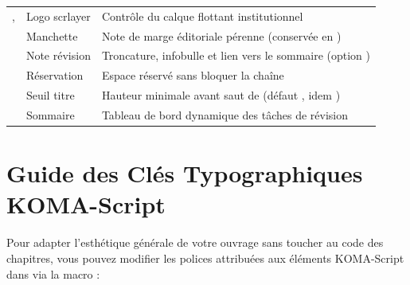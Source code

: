 \begin{table}[htbp]
\begin{tabularx}{\textwidth}{@{} l l Y @{}}
    ,  & Logo scrlayer & Contrôle du calque flottant institutionnel \\
     & Manchette & Note de marge éditoriale pérenne (conservée en ) \\
     & Note révision & Troncature, infobulle et lien vers le sommaire (option ) \\
     & Réservation & Espace réservé sans bloquer la chaîne \\
     & Seuil titre & Hauteur minimale avant saut de  (défaut , idem ) \\
     & Sommaire & Tableau de bord dynamique des tâches de révision \\
    \bottomrule
  \end{tabularx}
\end{table}

\clearpage

\section{Guide des Clés Typographiques KOMA-Script}
\label{sec:koma-font-keys}

Pour adapter l'esthétique générale de votre ouvrage sans toucher au code des chapitres,
vous pouvez modifier les polices attribuées aux éléments KOMA-Script dans 
via la macro  :

